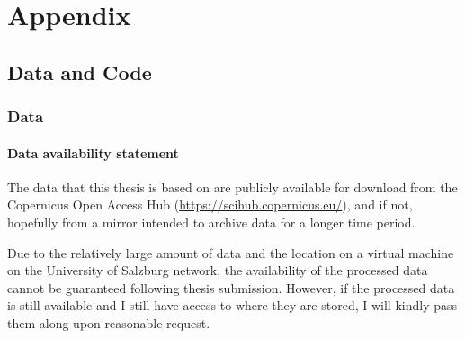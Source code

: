 \normalsize %
\setlength{\parindent}{0cm}%
\setlength{\leftskip}{0cm}%
\appendix
\cleardoublepage
\part{Appendix}


\chapter{Data and Code}

\section{Data} \label{app:data}

\subsection{Data availability statement}

The data that this thesis is based on are publicly available for download from the Copernicus Open Access Hub (\url{https://scihub.copernicus.eu/}), and if not, hopefully from a mirror intended to archive data for a longer time period.

Due to the relatively large amount of data and the location on a virtual machine on the University of Salzburg network, the availability of the processed data cannot be guaranteed following thesis submission.
However, if the processed data is still available and I still have access to where they are stored, I will kindly pass them along upon reasonable request.


